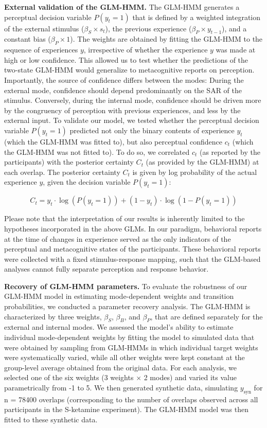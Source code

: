 \documentclass[
]{article}
\begin{document}
\textbf{External validation of the GLM-HMM.} The GLM-HMM generates a
perceptual decision variable \(P(y_t = 1)\) that is defined by a
weighted integration of the external stimulus (\(\beta_S \times s_t\)),
the previous experience (\(\beta_P \times y_{t-1}\)), and a constant
bias (\(\beta_P \times 1\)). The weights are obtained by fitting the
GLM-HMM to the sequence of experiences \(y\), irrespective of whether
the experience \(y\) was made at high or low confidence. This allowed us
to test whether the predictions of the two-state GLM-HMM would
generalize to metacognitive reports on perception. Importantly, the
source of confidence differs between the modes: During the external
mode, confidence should depend predominantly on the SAR of the stimulus.
Conversely, during the internal mode, confidence should be driven more
by the congruency of perception with previous experiences, and less by
the external input. To validate our model, we tested whether the
perceptual decision variable \(P(y_t = 1)\) predicted not only the
binary contents of experience \(y_t\) (which the GLM-HMM was fitted to),
but also perceptual confidence \(c_t\) (which the GLM-HMM was not fitted
to). To do so, we correlated \(c_t\) (as reported by the participants)
with the posterior certainty \(C_t\) (as provided by the GLM-HMM) at
each overlap. The posterior certainty \(C_t\) is given by log
probability of the actual experience \(y\), given the decision variable
\(P(y_t = 1)\):

\[
C_t = y_t \cdot \log(P(y_t = 1)) + (1 - y_t) \cdot \log(1 - P(y_t = 1)) 
\]

Please note that the interpretation of our results is inherently limited
to the hypotheses incorporated in the above GLMs. In our paradigm,
behavioral reports at the time of changes in experience served as the
only indicators of the perceptual and metacognitive states of the
participants. These behavioral reports were collected with a fixed
stimulus-response mapping, such that the GLM-based analyses cannot fully
separate perception and response behavior.

\textbf{Recovery of GLM-HMM parameters.} To evaluate the robustness of
our GLM-HMM model in estimating mode-dependent weights and transition
probabilities, we conducted a parameter recovery analysis. The GLM-HMM
is characterized by three weights, \(\beta_S\), \(\beta_B\), and
\(\beta_P\), that are defined separately for the external and internal
modes. We assessed the model's ability to estimate individual
mode-dependent weights by fitting the model to simulated data that were
obtained by sampling from GLM-HMMs in which individual target weights
were systematically varied, while all other weights were kept constant
at the group-level average obtained from the original data. For each
analysis, we selected one of the six weights (3 weights \(\times\) 2
modes) and varied its value parametrically from -1 to 5. We then
generated synthetic data, simulating \(y_{\text{syn}}\) for n = 78400
overlaps (corresponding to the number of overlaps observed across all
participants in the S-ketamine experiment). The GLM-HMM model was then
fitted to these synthetic data.
\end{document}

